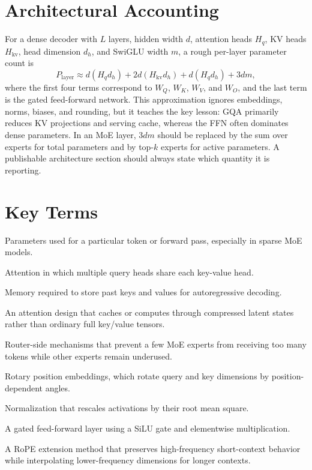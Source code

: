 \section{Architectural Accounting}
\label{sec:llama-architectural-accounting}

For a dense decoder with $L$ layers, hidden width $d$, attention heads $H_q$, KV heads $H_{\mathrm{kv}}$, head dimension $d_h$, and SwiGLU width $m$, a rough per-layer parameter count is
\begin{equation}
  P_{\mathrm{layer}}
  \approx
  d(H_q d_h) + 2d(H_{\mathrm{kv}}d_h) + d(H_q d_h)
  + 3dm,
\end{equation}
where the first four terms correspond to $W_Q$, $W_K$, $W_V$, and $W_O$, and the last term is the gated feed-forward network. This approximation ignores embeddings, norms, biases, and rounding, but it teaches the key lesson: GQA primarily reduces KV projections and serving cache, whereas the FFN often dominates dense parameters. In an MoE layer, $3dm$ should be replaced by the sum over experts for total parameters and by top-$k$ experts for active parameters. A publishable architecture section should always state which quantity it is reporting.

\section{Key Terms}
\label{sec:chapter-five-key-terms}

\begin{description}
\item[Activated parameters] Parameters used for a particular token or forward pass, especially in sparse MoE models.
\item[Grouped-query attention] Attention in which multiple query heads share each key-value head.
\item[KV-cache memory] Memory required to store past keys and values for autoregressive decoding.
\item[Latent attention] An attention design that caches or computes through compressed latent states rather than ordinary full key/value tensors.
\item[Load balancing] Router-side mechanisms that prevent a few MoE experts from receiving too many tokens while other experts remain underused.
\item[RoPE] Rotary position embeddings, which rotate query and key dimensions by position-dependent angles.
\item[RMSNorm] Normalization that rescales activations by their root mean square.
\item[SwiGLU] A gated feed-forward layer using a SiLU gate and elementwise multiplication.
\item[YaRN] A RoPE extension method that preserves high-frequency short-context behavior while interpolating lower-frequency dimensions for longer contexts.
\end{description}

